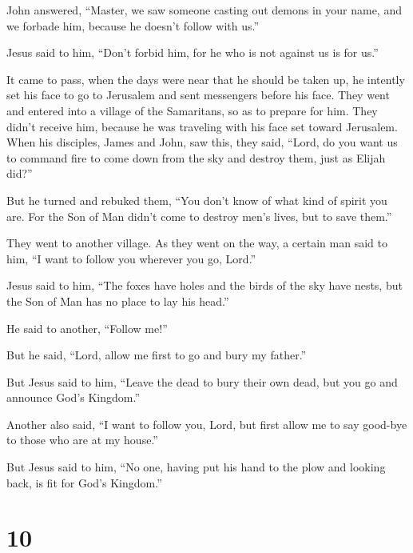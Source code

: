  John answered, ``Master, we saw someone casting out demons
in your name, and we forbade him, because he doesn't follow with us.''

 Jesus said to him, ``Don't forbid him, for he who is not
against us is for us.''

 It came to pass, when the days were near that he should be
taken up, he intently set his face to go to Jerusalem  and
sent messengers before his face. They went and entered into a village of
the Samaritans, so as to prepare for him.  They didn't
receive him, because he was traveling with his face set toward
Jerusalem.  When his disciples, James and John, saw this,
they said, ``Lord, do you want us to command fire to come down from the
sky and destroy them, just as Elijah did?''

 But he turned and rebuked them, ``You don't know of what
kind of spirit you are.  For the Son of Man didn't come to
destroy men's lives, but to save them.''

They went to another village.  As they went on the way, a
certain man said to him, ``I want to follow you wherever you go, Lord.''

 Jesus said to him, ``The foxes have holes and the birds of
the sky have nests, but the Son of Man has no place to lay his head.''

 He said to another, ``Follow me!''

But he said, ``Lord, allow me first to go and bury my father.''

 But Jesus said to him, ``Leave the dead to bury their own
dead, but you go and announce God's Kingdom.''

 Another also said, ``I want to follow you, Lord, but first
allow me to say good-bye to those who are at my house.''

 But Jesus said to him, ``No one, having put his hand to
the plow and looking back, is fit for God's Kingdom.''

\hypertarget{section-9}{%
\section{10}\label{section-9}}

